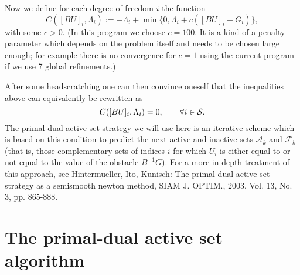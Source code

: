 \documentclass{article}
\begin{document}
Now we define for each degree of freedom $i$ the function
\begin{equation*}
 C([BU]_i,\Lambda_i):=-\Lambda_i + \min\lbrace 0, \Lambda_i + c([BU]_i - G_i) \rbrace,
\end{equation*}
with some $c>0$. (In this program we choose $c = 100$. It is a kind of a
penalty parameter which depends on the problem itself and needs to be chosen
large enough; for example there is no convergence for $c = 1$ using the
current program if we use 7 global refinements.)

After some headscratching one can then convince oneself that the inequalities
above can equivalently be rewritten as
\begin{equation*}
 C([BU]_i,\Lambda_i) = 0, \qquad \forall i\in{\cal S}.
\end{equation*}
The primal-dual active set strategy we will use here is an iterative scheme which is based on
this condition to predict the next active and inactive sets $\mathcal{A}_k$ and
$\mathcal{F}_k$ (that is, those complementary sets of indices $i$ for which
$U_i$ is either equal to or not equal to the value of the obstacle
$B^{-1}G$). For a more in depth treatment of this approach, see Hintermueller, Ito, Kunisch: The primal-dual active set
strategy as a semismooth newton method, SIAM J. OPTIM., 2003, Vol. 13, No. 3,
pp. 865-888.

\section{The primal-dual active set algorithm}
\end{document}
